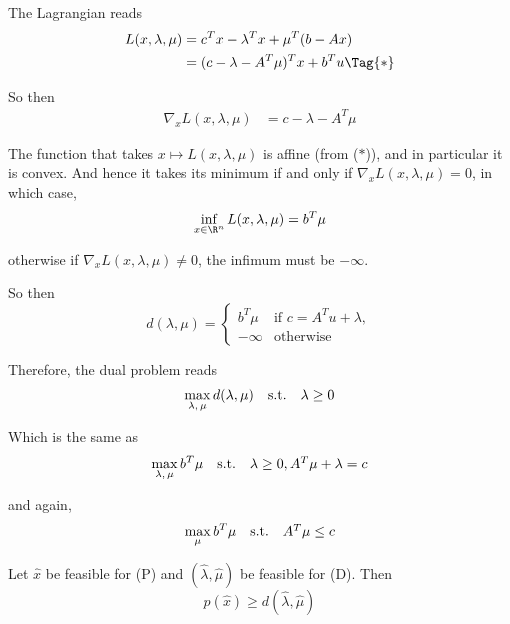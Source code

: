 The Lagrangian reads
\begin{align*}
	L(x,\lambda,\mu)
	 & =c^Tx-\lambda^Tx+\mu^T(b-Ax)         \\
	 & =(c-\lambda-A^T\mu)^Tx + b^Tu\Tag{*}
\end{align*}


So then
\begin{align*}
	\nabla_xL(x,\lambda,\mu)
	 & =c-\lambda-A^T\mu
\end{align*}

The function that takes $x\mapsto L(x,\lambda,\mu)$ is affine (from
($*$)), and in particular it is convex. And hence it takes its minimum
if and only if $\nabla_xL(x,\lambda,\mu)=0$, in which case,
$$
	\inf_{x\in\R^n}L(x,\lambda,\mu)=b^T\mu
$$

otherwise if $\nabla_xL(x,\lambda,\mu)\neq0$, the infimum must be
$-\infty$.

So then
$$
	d(\lambda,\mu)=\begin{cases}
		b^T\mu  & \text{if }c=A^Tu+\lambda, \\
		-\infty & \text{otherwise}
	\end{cases}
$$

Therefore, the dual problem reads
$$\begin{array}{l l l}\displaystyle
		\max_{\lambda,\,\mu}d(\lambda,\mu) & \text{s.t.} & \lambda\geq0
	\end{array}$$

Which is the same as
$$\begin{array}{l l l}\displaystyle
		\max_{\lambda,\,\mu}b^T\mu & \text{s.t.} & \lambda\geq0,A^T\mu+\lambda=c
	\end{array}$$

and again,
$$\begin{array}{l l l}\displaystyle
		\max_\mu b^T\mu & \text{s.t.} & A^T\mu\leq c
	\end{array}$$


\label{ad0b792}

Let $\hat x$ be feasible for (P) and $(\hat\lambda,\hat\mu)$ be
feasible for (D). Then
$$
	p(\hat x)\geq d(\hat\lambda,\hat\mu)
$$

